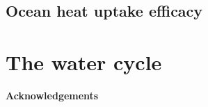 \documentclass[12pt]{book}
\begin{document}
\section{Ocean heat uptake efficacy}

\chapter{The water cycle}









\newpage



\vspace{5 mm}
\noindent
{\bf Acknowledgements} 



\newpage
\end{document}
